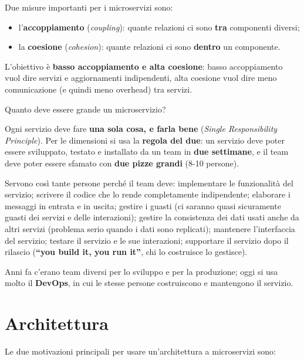 Due misure importanti per i microservizi sono:

\begin{itemize}
\tightlist
\item
  l'\textbf{accoppiamento} (\emph{coupling}): quante relazioni ci sono
  \textbf{tra} componenti diversi;
\item
  la \textbf{coesione} (\emph{cohesion}): quante relazioni ci sono
  \textbf{dentro} un componente.
\end{itemize}

L'obiettivo è \textbf{basso accoppiamento e alta coesione}: basso
accoppiamento vuol dire servizi e aggiornamenti indipendenti, alta
coesione vuol dire meno comunicazione (e quindi meno overhead) tra
servizi.

\begin{boxtip}{Quanto deve essere grande un microservizio?}

Ogni servizio deve fare \textbf{una sola cosa, e farla bene}
(\emph{Single Responsibility Principle}). Per le dimensioni si usa la
\textbf{regola del due}: un servizio deve poter essere sviluppato,
testato e installato da un team in \textbf{due settimane}, e il team
deve poter essere sfamato con \textbf{due pizze grandi} (8-10 persone).

\end{boxtip}

Servono così tante persone perché il team deve: implementare le
funzionalità del servizio; scrivere il codice che lo rende completamente
indipendente; elaborare i messaggi in entrata e in uscita; gestire i
guasti (ci saranno quasi sicuramente guasti dei servizi e delle
interazioni); gestire la consistenza dei dati usati anche da altri
servizi (problema serio quando i dati sono replicati); mantenere
l'interfaccia del servizio; testare il servizio e le sue interazioni;
supportare il servizio dopo il rilascio (\textbf{``you build it, you run
it''}, chi lo costruisce lo gestisce).

Anni fa c'erano team diversi per lo sviluppo e per la produzione; oggi
si usa molto il \textbf{DevOps}, in cui le stesse persone costruiscono e
mantengono il servizio.

\section{Architettura}\label{architettura}

Le due motivazioni principali per usare un'architettura a microservizi
sono:

